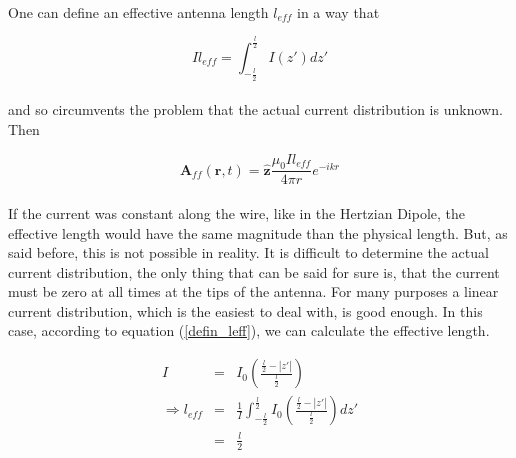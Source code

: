 \documentclass[a4paper,10pt]{thesis}
\begin{document}
\paragraph*{}
One can define an effective antenna length $l_{eff}$ in a way that

\begin{equation}\label{defin_leff}
Il_{eff}= \int_{-\frac{l}{2}}^{\frac{l}{2}} I(z') dz'
\end{equation}

\paragraph*{}
and so circumvents the problem that the actual current distribution is unknown. Then

\begin{equation}\label{shd_A_solution}
\mathbf{A}_{ff}(\mathbf{r},t) = \mathbf{\hat{z}} \frac{\mu_0 I l_{eff}}{4 \pi r} e^{-ikr}
\end{equation}

\paragraph*{}
If the current was constant along the wire, like in the Hertzian Dipole, the effective length would have the same magnitude than the physical length. But, as said before, this is not possible in reality. It is difficult to determine the actual current distribution, the only thing that can be said for sure is, that the current must be zero at all times at the tips of the antenna. For many purposes a linear current distribution, which is the easiest to deal with, is good enough. In this case, according to equation (\ref{defin_leff}), we can calculate the effective length.


\begin{eqnarray}
I&=&I_0 \left( \frac{\frac{l}{2}-|z'|}{\frac{l}{2}}\right) \label{l_eff_shd_1} \\
\Rightarrow  l_{eff}&=& \frac{1}{I} \int_{-\frac{l}{2}}^{\frac{l}{2}} I_0 \left( \frac{\frac{l}{2}-|z'|}{\frac{l}{2}}\right) dz' \label{l_eff_shd_2} \\
&=&\frac{l}{2} \nonumber
\end{eqnarray}
\end{document}
